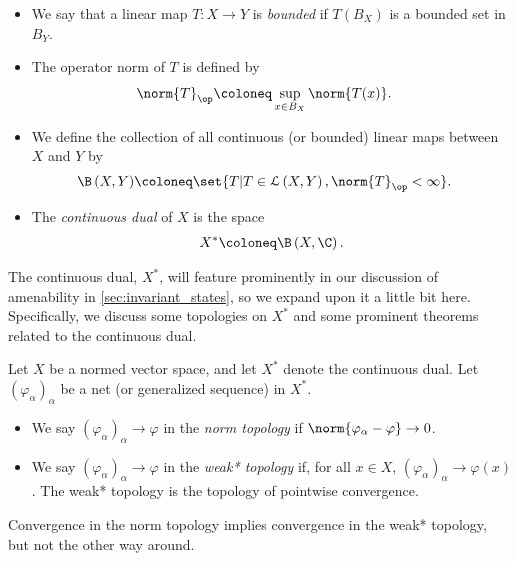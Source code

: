 \documentclass[10pt]{mypackage2}
\begin{document}
\begin{definition}\hfill
  \begin{itemize}
    \item We say that a linear map $T\colon X\rightarrow Y$ is \textit{bounded} if $T\left( B_X \right)$ is a bounded set in $B_Y$.
    \item The operator norm of $T$ is defined by
      \begin{align*}
        \norm{T}_{\op} &\coloneq \sup_{x\in B_{X}} \norm{T(x)}.
      \end{align*}
    \item We define the collection of all continuous (or bounded) linear maps between $X$ and $Y$ by
      \begin{align*}
        \B\left( X,Y \right) &\coloneq \set{T | T\in \mathcal{L}\left( X,Y \right), \norm{T}_{\op} < \infty}.
      \end{align*}
    \item The \textit{continuous dual} of $X$ is the space
      \begin{align*}
        X^{\ast}\coloneq \B\left( X,\C \right).
      \end{align*}
  \end{itemize}
\end{definition}
The continuous dual, $X^{\ast}$, will feature prominently in our discussion of amenability in \ref{sec:invariant_states}, so we expand upon it a little bit here. Specifically, we discuss some topologies on $X^{\ast}$ and some prominent theorems related to the continuous dual.
\begin{definition}
  Let $X$ be a normed vector space, and let $X^{\ast}$ denote the continuous dual. Let $\left( \varphi_{\alpha} \right)_{\alpha}$ be a net (or generalized sequence) in $X^{\ast}$.
  \begin{itemize}
    \item We say $\left( \varphi_{\alpha} \right)_{\alpha}\rightarrow \varphi$ in the \textit{norm topology} if $\norm{\varphi_{\alpha} - \varphi}\rightarrow 0$.
    \item We say $\left( \varphi_{\alpha} \right)_{\alpha}\rightarrow \varphi$ in the \textit{weak* topology} if, for all $x\in X$, $\left( \varphi_{\alpha} \right)_{\alpha}\rightarrow \varphi(x)$. The weak* topology is the topology of pointwise convergence.
  \end{itemize}
\end{definition}
\begin{remark}
  Convergence in the norm topology implies convergence in the weak* topology, but not the other way around.
\end{remark}
\end{document}
